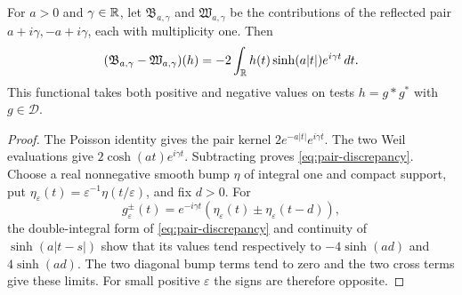 \begin{proposition}\label{prop:sign}
For $a>0$ and $\gamma\in\mathbb R$, let $\mathfrak B_{a,\gamma}$ and
$\mathfrak W_{a,\gamma}$ be the contributions of the reflected
pair $a+i\gamma,-a+i\gamma$, each with multiplicity one.
Then
\begin{equation}\label{eq:pair-discrepancy}
 (\mathfrak B_{a,\gamma}-\mathfrak W_{a,\gamma})(h)
       =-2\int_\mathbb R h(t)\sinh(a|t|)e^{i\gamma t}\,dt.
\end{equation}
This functional takes both positive and negative values on tests
$h=g*g^*$ with $g\in\mathcal D$.
\end{proposition}
\begin{proof}
The Poisson identity gives the pair kernel $2e^{-a|t|}e^{i\gamma t}$.
The two Weil evaluations give $2\cosh(at)e^{i\gamma t}$.
Subtracting proves \eqref{eq:pair-discrepancy}.
Choose a real nonnegative smooth bump $\eta$ of integral one and
compact support, put $\eta_\varepsilon(t)=\varepsilon^{-1}
\eta(t/\varepsilon)$, and fix $d>0$. For
\[
 g_\varepsilon^\pm(t)=e^{-i\gamma t}
       (\eta_\varepsilon(t)\mathbin\pm\eta_\varepsilon(t-d)),
\]
the double-integral form of \eqref{eq:pair-discrepancy} and
continuity of $\sinh(a|t-s|)$ show that its values tend respectively
to $-4\sinh(ad)$ and $4\sinh(ad)$. The two diagonal bump terms
tend to zero and the two cross terms give these limits. For small
positive $\varepsilon$ the signs are therefore opposite.
\end{proof}

